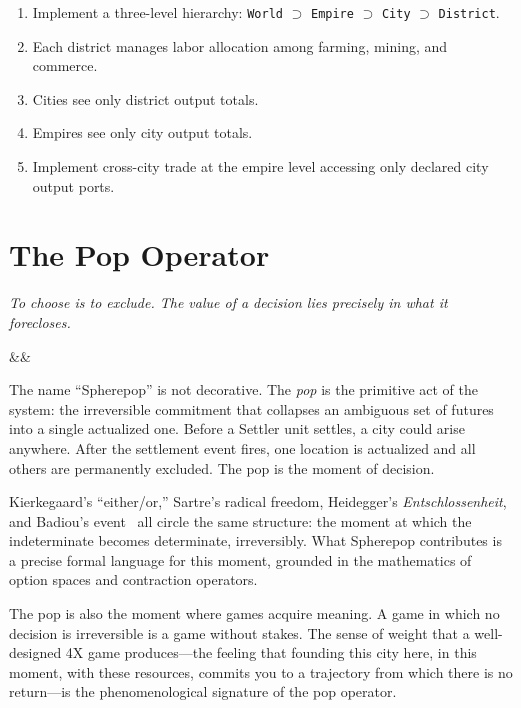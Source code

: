 \documentclass[11pt,a4paper,openany]{book}
\theoremstyle{plain}
\theoremstyle{definition}
\theoremstyle{remark}
\newenvironment{background}{%
  \begin{mdframed}[
    linecolor=sphereblue!40, backgroundcolor=sphereblue!5,
    linewidth=1pt, innertopmargin=8pt, innerbottommargin=8pt,
    innerleftmargin=10pt, innerrightmargin=10pt,
    skipabove=10pt, skipbelow=6pt
  ]%
  \setlength{\parindent}{0pt}%
  \noindent{\textcolor{sphereblue}{\textbf{Background}}}\par\smallskip\ignorespaces
}{\end{mdframed}}
\newenvironment{project}[1]{%
  \begin{tcolorbox}[
    title={\textbf{Project: #1}},
    colback=projectbg,
    colframe=sphereblue,
    fonttitle=\bfseries\color{white},
    coltitle=white,
    attach boxed title to top left={yshift=-2mm, xshift=4mm},
    boxed title style={colback=sphereblue, sharp corners},
    sharp corners,
    breakable,
    before upper={\normalfont\setlength{\parindent}{0pt}\tolerance=9999\hbadness=9999}
  ]
}{\end{tcolorbox}}
\newcommand{\chapterquote}[2]{%
  \par\vspace{0.8em}%
  \begin{flushright}%
    \begin{minipage}{0.65\textwidth}%
      {\itshape #1\par}%
      \ifx&#2&\else\vspace{0.3em}{\raggedleft\small--- #2\par}\fi%
    \end{minipage}%
  \end{flushright}%
  \vspace{0.8em}\par\noindent}
\begin{document}
\begin{project}{Nested Local Economies}
  \begin{enumerate}
    \item Implement a three-level hierarchy:
          \texttt{World} $\supset$ \texttt{Empire} $\supset$
          \texttt{City} $\supset$ \texttt{District}.
    \item Each district manages labor allocation among farming, mining,
          and commerce.
    \item Cities see only district output totals.
    \item Empires see only city output totals.
    \item Implement cross-city trade at the empire level accessing only
          declared city output ports.
  \end{enumerate}
\end{project}

\chapter{The Pop Operator}
\label{ch:pop}

\chapterquote{To choose is to exclude. The value of a decision lies precisely
  in what it forecloses.
}{}

\begin{background}
  The name ``Spherepop'' is not decorative. The \emph{pop} is the
  primitive act of the system: the irreversible commitment that collapses
  an ambiguous set of futures into a single actualized one. Before a
  Settler unit settles, a city could arise anywhere. After the settlement
  event fires, one location is actualized and all others are permanently
  excluded. The pop is the moment of decision.

  Kierkegaard's ``either/or,'' Sartre's radical freedom, Heidegger's
  \emph{Entschlossenheit}, and Badiou's event~\cite{Badiou} all circle
  the same structure: the moment at which the indeterminate becomes
  determinate, irreversibly. What Spherepop contributes is a precise
  formal language for this moment, grounded in the mathematics of option
  spaces and contraction operators.

  The pop is also the moment where games acquire meaning. A game in which
  no decision is irreversible is a game without stakes. The sense of
  weight that a well-designed 4X game produces---the feeling that founding
  this city here, in this moment, with these resources, commits you to a
  trajectory from which there is no return---is the phenomenological
  signature of the pop operator.
\end{background}
\end{document}
